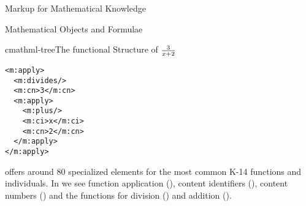 \begin{tchapter}[id=math-markup]{Markup for Mathematical Knowledge}
\begin{tsection}[id=math-objects]{Mathematical Objects and Formulae}
\begin{tsubsection}[id=math-markup:mathml]{{\mathml}}
\begin{myfig}{cmathml-tree}{The functional Structure of $3\over x+2$}
\begin{minipage}{3cm}
\begin{lstlisting}[numbers=none,frame=none]
<m:apply>
  <m:divides/>
  <m:cn>3</m:cn>
  <m:apply>
    <m:plus/>
    <m:ci>x</m:ci>
    <m:cn>2</m:cn>
  </m:apply>
</m:apply>
\end{lstlisting}
\end{minipage}\hspace*{3em}
\begin{minipage}{4cm}
\end{minipage}
\end{myfig}

{\cmathml} offers around 80 specialized elements for the most common K-14 functions and
individuals. In {} we see function application
({}), content identifiers ({}), content
numbers ({}) and the functions for division
({}) and addition ({}).


\end{tsubsection}
\end{tsection}
\end{tchapter}
